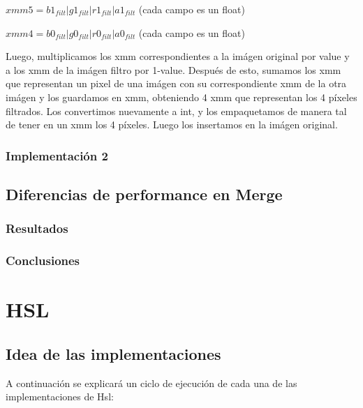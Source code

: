 \documentclass[a4paper]{article}
\begin{document}
\vspace*{0.3cm}

$xmm5 = b1_{filt} | g1_{filt} | r1_{filt} | a1_{filt}$   (cada campo es un float)

\vspace*{0.3cm}

$xmm4 = b0_{filt} | g0_{filt} | r0_{filt} | a0_{filt}$   (cada campo es un float)

\vspace*{0.3cm}

Luego, multiplicamos los xmm correspondientes a la imágen original por value y a los xmm de la imágen filtro por 1-value. Después de esto, sumamos los xmm que representan un pixel de una imágen con su correspondiente xmm de la otra imágen y los guardamos en xmm, obteniendo 4 xmm que representan los 4 píxeles filtrados. Los convertimos nuevamente a int, y los empaquetamos de manera tal de tener en un xmm los 4 píxeles. Luego los insertamos en la imágen original.

\vspace*{0.3cm}

\subsubsection{Implementación 2}



\subsection{Diferencias de performance en Merge}


\subsubsection{Resultados}

\subsubsection{Conclusiones}


\newpage

\section{HSL}

\subsection{Idea de las implementaciones}
A continuación se explicará un ciclo de ejecución de cada una de las implementaciones de Hsl:
\end{document}
